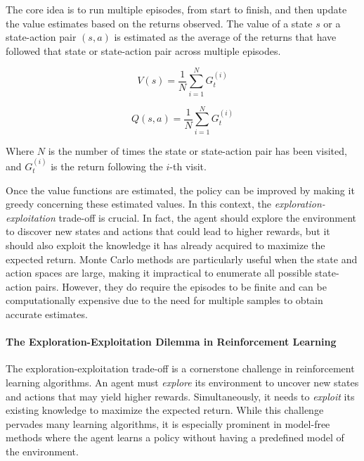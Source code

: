 The core idea is to run multiple episodes, 
 from start to finish, and then update the value estimates based on the returns observed. 
 The value of a state \(s\) or a state-action pair \((s, a)\) is estimated as the average of the returns that have followed that state or state-action pair across multiple episodes.

\begin{equation}
V(s) = \frac{1}{N} \sum_{i=1}^{N} G_t^{(i)}
\end{equation}

\begin{equation}
Q(s, a) = \frac{1}{N} \sum_{i=1}^{N} G_t^{(i)}
\end{equation}

Where \(N\) is the number of times the state or state-action pair has been visited, 
 and \(G_t^{(i)}\) is the return following the \(i\)-th visit.

Once the value functions are estimated, 
 the policy can be improved by making it greedy concerning these estimated values. 
%
In this context, the \emph{exploration-exploitation} trade-off is crucial.
%
In fact, the agent should explore the environment to discover new states and actions that could lead to higher rewards,
  but it should also exploit the knowledge it has already acquired to maximize the expected return.
%
Monte Carlo methods are particularly useful when the state and action spaces are large, 
 making it impractical to enumerate all possible state-action pairs. 
 However, they do require the episodes to be finite and can be computationally expensive due to the need for multiple samples to obtain accurate estimates.

\paragraph*{The Exploration-Exploitation Dilemma in Reinforcement Learning}
The exploration-exploitation trade-off is a cornerstone challenge in reinforcement learning algorithms. 
 An agent must \emph{explore} its environment 
 to uncover new states and actions that may yield higher rewards. 
% 
Simultaneously, 
 it needs to \emph{exploit} its existing knowledge to maximize the expected return. 
 While this challenge pervades many learning algorithms, 
 it is especially prominent in model-free methods 
 where the agent learns a policy without having a predefined model of the environment.

